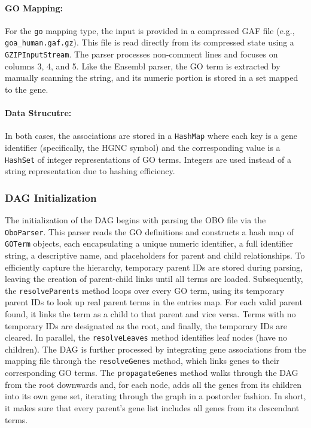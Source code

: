 \documentclass{article}
\begin{document}
    \paragraph{GO Mapping:}
    For the \texttt{go} mapping type, the input is provided in a compressed GAF file (e.g., \texttt{goa\_human.gaf.gz}). This file is read directly from its compressed state using a \texttt{GZIPInputStream}. The parser processes non-comment lines and focuses on columns 3, 4, and 5. Like the Ensembl parser, the GO term is extracted by manually scanning the string, and its numeric portion is stored in a set mapped to the gene.

    \paragraph{Data Strucutre:}
    In both cases, the associations are stored in a \texttt{HashMap} where each key is a gene identifier (specifically, the HGNC symbol) and the corresponding value is a \texttt{HashSet} of integer representations of GO terms. Integers are used instead of a string representation due to hashing efficiency.

    \subsubsection{DAG Initialization}\label{subsubsec:dag-initialization}
    The initialization of the DAG begins with parsing the OBO file via the \texttt{OboParser}. This parser reads the GO definitions and constructs a hash map of \texttt{GOTerm} objects, each encapsulating a unique numeric identifier, a full identifier string, a descriptive name, and placeholders for parent and child relationships. To efficiently capture the hierarchy, temporary parent IDs are stored during parsing, leaving the creation of parent-child links until all terms are loaded. Subsequently, the \texttt{resolveParents} method loops over every GO term, using its temporary parent IDs to look up real parent terms in the entries map. For each valid parent found, it links the term as a child to that parent and vice versa. Terms with no temporary IDs are designated as the root, and finally, the temporary IDs are cleared. In parallel, the \texttt{resolveLeaves} method identifies leaf nodes (have no children). The DAG is further processed by integrating gene associations from the mapping file through the \texttt{resolveGenes} method, which links genes to their corresponding GO terms. The \texttt{propagateGenes} method walks through the DAG from the root downwards and, for each node, adds all the genes from its children into its own gene set, iterating through the graph in a postorder fashion. In short, it makes sure that every parent’s gene list includes all genes from its descendant terms.
\end{document}
